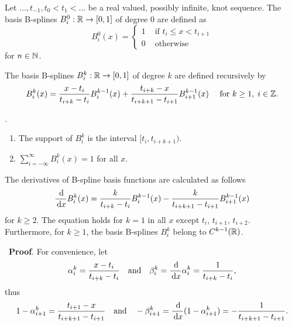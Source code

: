 \begin{definition}[B-splines]\label{Bspline}
Let $...,t_{-1},t_0<t_1<...$ be a real valued, possibly infinite, knot sequence. The basis B-splines $B_i^0: \mathbb R \to [0,1]$ of degree 0 are defined as
\begin{equation}
  B_i^0(x) = 
  \begin{cases}
    1 & \mbox{ if } t_i\leq x < t_{i+1}\\
    0 & \mbox{ otherwise}
  \end{cases}
\end{equation}
for $n\in\mathbb N$.

The basis B-splines $B_i^k:\mathbb R\to [0,1]$ of degree $k$ are defined recursively by
\begin{equation}
  B_i^k(x) = \frac{x-t_i}{t_{i+k}-t_i} B_i^{k-1}(x) + \frac{t_{i+k}-x}{t_{i+k+1}-t_{i+1}} B_{i+1}^{k-1}(x) \quad \text{ for } k\geq 1,\;i\in \Z.\label{recurDef}
\end{equation}
\end{definition}
\vspace{0.5cm}
\begin{remark}\label{remark}.
  \begin{enumerate}
    \item The support of $B_i^k$ is the interval $[t_i,t_{i+k+1})$.
    \item $\displaystyle\sum_{i=-\infty}^\infty B_i^k(x) = 1$ for all $x$.\label{property2}
  \end{enumerate}
\end{remark}
\vspace{0.5cm}
\begin{lemma}\label{derBspline} 
The derivatives of B-spline basis functions are calculated as follows
  \begin{equation}
    \frac{\df}{\df x} B_i^k(x) = \frac{k}{t_{i+k}-t_i}B_i^{k-1}(x) - \frac{k}{t_{i+k+1}-t_{i+1}}B_{i+1}^{k-1}(x)\label{DerBspline}
  \end{equation}
  for $k\geq 2$. The equation holds for $k=1$ in all $x$ except $t_i,\,t_{i+1},\,t_{i+2}$.
  Furthermore, for $k\geq 1$, the basis B-splines $B_i^k$ belong to $C^{k-1}(\mathbb R)$.
\end{lemma}\
\textbf{Proof}. For convenience, let 
\[
  \alpha_i^k = \frac{x-t_i}{t_{i+k}-t_{i}} \quad\mbox{and}\quad \beta_i^k = \frac{\,{\rm d}}{\,{\rm d} x} \alpha_i^k = \frac{1}{t_{i+k}-t_{i}},
\]
thus
\[
  1-\alpha_{i+1}^k = \frac{t_{i+1}-x}{t_{i+k+1}-t_{i+1}} \quad\mbox{and}\quad -\beta_{i+1}^k = \frac{\,{\rm d}}{\,{\rm d} x} (1-\alpha_{i+1}^k) = -\frac{1}{t_{i+k+1}-t_{i+1}}.
\]

